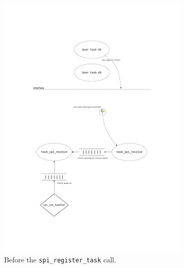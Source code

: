 \begin{figure}[htb]
  \begin{subfigure}{0.49\textwidth}
    \centering
    \includegraphics[width=\textwidth,clip,trim=90 480 90 150]{content/04_communication/figures/spi_task_diagram_initial_1.pdf}
    \caption{Before the \texttt{spi\_register\_task} call.}
    \label{fig:spi_task_diagram_initial_1}
  \end{subfigure}
  \begin{subfigure}{0.49\textwidth}
    \centering

\end{subfigure}
\end{figure}
